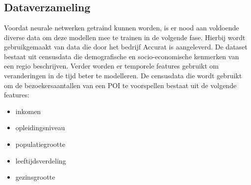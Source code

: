 
\chapter{}%
\label{ch:methodologie}



\section{Dataverzameling}

Voordat neurale netwerken getraind kunnen worden, is er nood aan voldoende
diverse data om deze modellen mee te trainen in de volgende fase. Hierbij wordt
gebruikgemaakt van data die door het bedrijf Accurat is aangeleverd. De dataset
bestaat uit censusdata die demografische en socio-economische kenmerken van
een regio beschrijven. Verder worden er temporele features gebruikt om veranderingen in de tijd beter te modelleren. De censusdata die wordt gebruikt om de bezoekersaantallen van een POI te voorspellen bestaat uit de volgende features:

\begin{itemize}
    \item inkomen
    \item opleidingsniveau
    \item populatiegrootte
    \item leeftijdsverdeling
    \item gezinsgrootte
\end{itemize}

